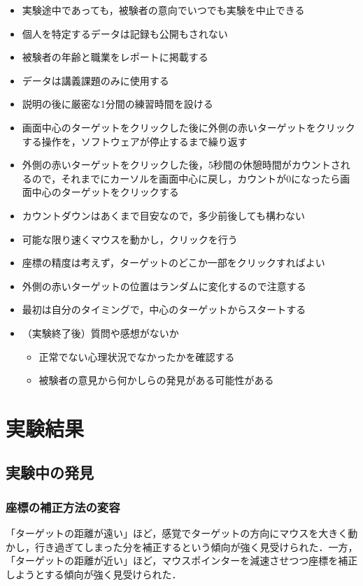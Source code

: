 \documentclass[a4paper, papersize, titlepage]{jsarticle}
\begin{document}
\begin{multicols}{2}
\begin{itemize}
\item 実験途中であっても，被験者の意向でいつでも実験を中止できる
\item 個人を特定するデータは記録も公開もされない
\item 被験者の年齢と職業をレポートに掲載する
\item データは講義課題のみに使用する
\item 説明の後に厳密な1分間の練習時間を設ける
\item 画面中心のターゲットをクリックした後に外側の赤いターゲットをクリックする操作を，ソフトウェアが停止するまで繰り返す
\item 外側の赤いターゲットをクリックした後，5秒間の休憩時間がカウントされるので，それまでにカーソルを画面中心に戻し，カウントが0になったら画面中心のターゲットをクリックする
\item カウントダウンはあくまで目安なので，多少前後しても構わない
\item 可能な限り速くマウスを動かし，クリックを行う
\item 座標の精度は考えず，ターゲットのどこか一部をクリックすればよい
\item 外側の赤いターゲットの位置はランダムに変化するので注意する
\item 最初は自分のタイミングで，中心のターゲットからスタートする
\item （実験終了後）質問や感想がないか
\begin{itemize}
\item 正常でない心理状況でなかったかを確認する
\item 被験者の意見から何かしらの発見がある可能性がある
\end{itemize}
\end{itemize}


\section{実験結果}
\subsection{実験中の発見}
\subsubsection{座標の補正方法の変容}
「ターゲットの距離が遠い」ほど，感覚でターゲットの方向にマウスを大きく動かし，行き過ぎてしまった分を補正するという傾向が強く見受けられた．一方，「ターゲットの距離が近い」ほど，マウスポインターを減速させつつ座標を補正しようとする傾向が強く見受けられた．


\end{multicols}
\end{document}
